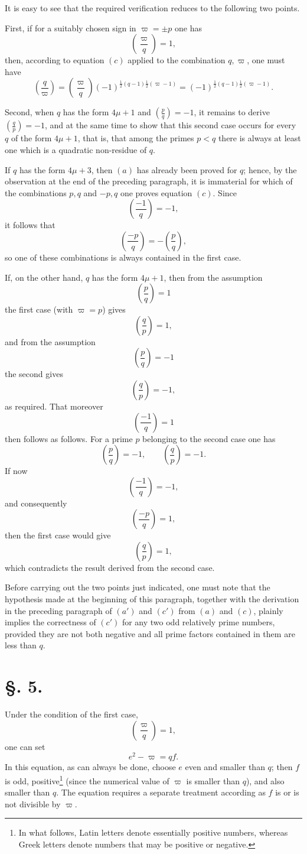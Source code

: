 \documentclass[11pt]{article}
\newcommand{\J}[2]{\left(\frac{#1}{#2}\right)}
\begin{document}
It is easy to see that the required verification reduces to the following two points.

First, if for a suitably chosen sign in $\varpi=\pm p$ one has
\[
 \J{\varpi}{q}=1,
\]
then, according to equation $(c)$ applied to the combination $q,\varpi$, one must have
\[
 \J{q}{\varpi}=\J{\varpi}{q}(-1)^{\frac12(q-1)\frac12(\varpi-1)}=(-1)^{\frac12(q-1)\frac12(\varpi-1)}.
\]

Second, when $q$ has the form $4\mu+1$ and $\J{p}{q}=-1$, it remains to derive $\J{q}{p}=-1$, and at the same time to show that this second case occurs for every $q$ of the form $4\mu+1$, that is, that among the primes $p<q$ there is always at least one which is a quadratic non-residue of $q$.

If $q$ has the form $4\mu+3$, then $(a)$ has already been proved for $q$; hence, by the observation at the end of the preceding paragraph, it is immaterial for which of the combinations $p,q$ and $-p,q$ one proves equation $(c)$. Since
\[
 \J{-1}{q}=-1,
\]
it follows that
\[
 \J{-p}{q}=-\J{p}{q},
\]
so one of these combinations is always contained in the first case.

If, on the other hand, $q$ has the form $4\mu+1$, then from the assumption
\[
 \J{p}{q}=1
\]
the first case (with $\varpi=p$) gives
\[
 \J{q}{p}=1,
\]
and from the assumption
\[
 \J{p}{q}=-1
\]
the second gives
\[
 \J{q}{p}=-1,
\]
as required. That moreover
\[
 \J{-1}{q}=1
\]
then follows as follows. For a prime $p$ belonging to the second case one has
\[
 \J{p}{q}=-1,
\qquad
 \J{q}{p}=-1.
\]
If now
\[
 \J{-1}{q}=-1,
\]
and consequently
\[
 \J{-p}{q}=1,
\]
then the first case would give
\[
 \J{q}{p}=1,
\]
which contradicts the result derived from the second case.

Before carrying out the two points just indicated, one must note that the hypothesis made at the beginning of this paragraph, together with the derivation in the preceding paragraph of $(a')$ and $(c')$ from $(a)$ and $(c)$, plainly implies the correctness of $(c')$ for any two odd relatively prime numbers, provided they are not both negative and all prime factors contained in them are less than $q$.

\section*{\S. 5.}

Under the condition of the first case,
\[
 \J{\varpi}{q}=1,
\]
one can set
\[
 e^2-\varpi=qf.
\]
In this equation, as can always be done, choose $e$ even and smaller than $q$; then $f$ is odd, positive\footnote{In what follows, Latin letters denote essentially positive numbers, whereas Greek letters denote numbers that may be positive or negative.} (since the numerical value of $\varpi$ is smaller than $q$), and also smaller than $q$. The equation requires a separate treatment according as $f$ is or is not divisible by $\varpi$.
\end{document}
